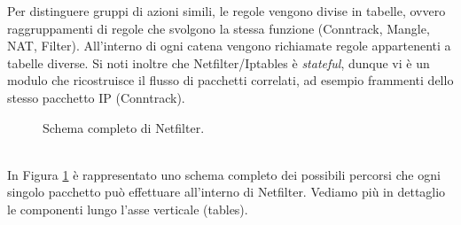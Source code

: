 Per distinguere gruppi di azioni simili, le regole vengono divise in tabelle, ovvero raggruppamenti di regole che svolgono la stessa funzione (Conntrack, Mangle, NAT, Filter). All'interno di ogni catena vengono richiamate regole appartenenti a tabelle diverse. Si noti inoltre che Netfilter/Iptables è \textit{stateful}, dunque vi è un modulo che ricostruisce il flusso di pacchetti correlati, ad esempio frammenti dello stesso pacchetto IP (Conntrack).
\begin{figure}[h]
	\caption{Schema completo di Netfilter.}
	\label{img:nfk-traversal}
\end{figure}\\
In Figura \ref{img:nfk-traversal} è rappresentato uno schema completo dei possibili percorsi che ogni singolo pacchetto può effettuare all'interno di Netfilter. Vediamo più in dettaglio le componenti lungo l'asse verticale (tables).

